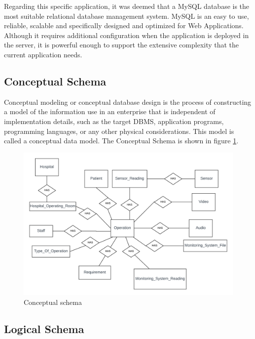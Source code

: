 Regarding this specific application, it was deemed that a MySQL\cite{mysql} database is the most suitable relational database management system. MySQL is an easy to use, reliable, scalable and specifically designed and optimized for Web Applications. Although it requires additional configuration when the application is deployed in the server, it is powerful enough to support the extensive complexity that the current application needs.

\subsection{Conceptual Schema}
Conceptual modeling or conceptual database design is the process of constructing a model of the information use in an enterprise that is independent of implementation details, such as the target DBMS, application programs, programming
languages, or any other physical considerations. This model is called a conceptual
data model\cite{Database_Systems}. The Conceptual Schema is shown in figure \ref{conceptual_schema}.


\begin{figure}[h]
\begin{center}
\includegraphics[width=17cm]{imgs/conceptual_schema.png}
\end{center}\vspace{-0.3cm}
\caption[Conceptual schema]{Conceptual schema} \label{conceptual_schema}
\end{figure}



\subsection{Logical Schema}

